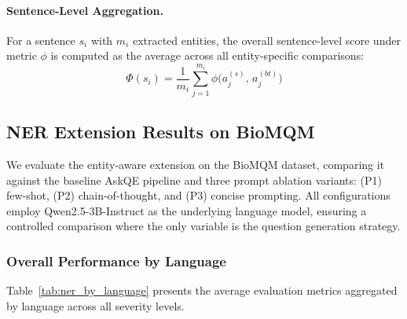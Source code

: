 \paragraph{Sentence-Level Aggregation.}
For a sentence $s_i$ with $m_i$ extracted entities, the overall sentence-level score under metric $\phi$ is computed as the average across all entity-specific comparisons:
\begin{equation}
    \Phi(s_i) = \frac{1}{m_i} \sum_{j=1}^{m_i} \phi\big(a_j^{(s)}, \, a_j^{(bt)}\big)
    \label{eq:sentence_agg}
\end{equation}



\subsection{NER Extension Results on BioMQM}
\label{sec:ner_results}

We evaluate the entity-aware extension on the BioMQM dataset, comparing it against the baseline AskQE pipeline and three prompt ablation variants: (P1) few-shot, (P2) chain-of-thought, and (P3) concise prompting. All configurations employ Qwen2.5-3B-Instruct as the underlying language model, ensuring a controlled comparison where the only variable is the question generation strategy.

\subsubsection{Overall Performance by Language}

Table~\ref{tab:ner_by_language} presents the average evaluation metrics aggregated by language across all severity levels.

